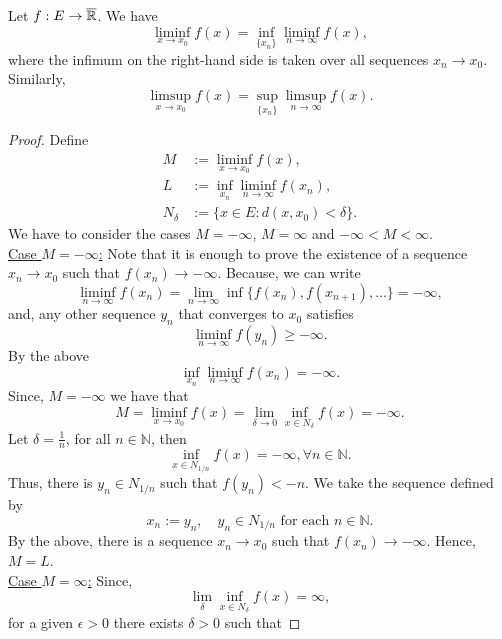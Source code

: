     \begin{lemma}
        Let $f : E \to \overline{\mathbb{R}} $. We have
        $$
            \liminf_{x \to x_0} f(x) = \inf_{\{x_n\}}{\liminf_{n \to \infty}f(x)},
        $$
        where the infimum on the right-hand side is taken over all sequences 
        $x_n \to x_0$. Similarly, 
        $$
            \limsup_{x \to x_0} f(x) = \sup_{\{x_n\}}{\limsup_{n \to \infty}f(x)}.
        $$
    \end{lemma}
    \begin{proof}
        Define 
        \begin{align*}
            M &:= \liminf_{x \to x_0} f(x),  \\
            L &:= \inf_{x_n}{\liminf_{n \to \infty} f(x_n)}, \\
            N_{\delta} &:= \{ x \in E : d(x, x_0) < \delta \}.
        \end{align*}
        We have to consider the cases $M = - \infty$, $M = \infty$ and 
        $ -\infty < M < \infty $. \\
        \underline{Case $M = -\infty$:}
        Note that it is enough to prove the 
        existence of a sequence $x_n \to x_0$ such that $f(x_n) \to - \infty$. 
        Because, we can write
        $$
            \liminf_{n \to \infty}{f(x_n)} = \lim_{n \to \infty} %
            \inf \{ f(x_n), f(x_{n+1}), \ldots \} = - \infty,
        $$
        and, any other sequence $y_n$ that converges to $x_0$ satisfies
        $$
            \liminf_{n \to \infty}f(y_n) \geq - \infty.
        $$
        By  the above 
        $$
            \inf_{x_n} \liminf_{n \to \infty} f(x_n) = -\infty.
        $$
        Since, $M = -\infty$ we have that
        $$
            M = \liminf_{x \to x_0} f(x) = \lim_{\delta \to 0} %
            \inf_{x \in N_{\delta}} f(x) = - \infty .
        $$
        Let $\delta = \frac{1}{n}$, for all $n \in \mathbb{N}$, then
        $$
            \inf_{x \in N_{1/n}} f(x) = -\infty, \forall n \in \mathbb{N}.
        $$
        Thus, there is $y_n \in N_{1/n}$ such that $f(y_n) < -n$. We take the 
        sequence defined by 
        $$
            x_n := y_n, \quad y_n \in  N_{1/n} \text{ for each } n \in \mathbb{N}.
        $$
        By the above, there is a sequence $x_n \to x_0$ such that 
        $f(x_n) \to - \infty$. Hence, $M = L$. \\
        \underline{Case $M = \infty$:} Since,
        $$
            \lim_{\delta} \inf_{x \in N_{\delta}} f(x) = \infty, 
        $$
        for a given $\epsilon > 0 $ there exists $\delta > 0 $ such that 

\end{proof}
